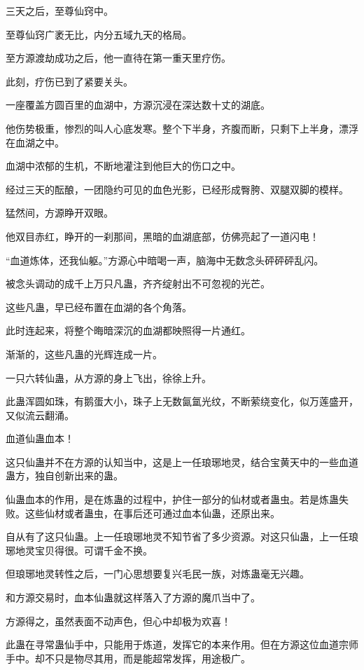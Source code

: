 
\begin{this_body}

三天之后，至尊仙窍中。

至尊仙窍广袤无比，内分五域九天的格局。

至方源渡劫成功之后，他一直待在第一重天里疗伤。

此刻，疗伤已到了紧要关头。

一座覆盖方圆百里的血湖中，方源沉浸在深达数十丈的湖底。

他伤势极重，惨烈的叫人心底发寒。整个下半身，齐腹而断，只剩下上半身，漂浮在血湖之中。

血湖中浓郁的生机，不断地灌注到他巨大的伤口之中。

经过三天的酝酿，一团隐约可见的血色光影，已经形成臀胯、双腿双脚的模样。

猛然间，方源睁开双眼。

他双目赤红，睁开的一刹那间，黑暗的血湖底部，仿佛亮起了一道闪电！

“血道炼体，还我仙躯。”方源心中暗喝一声，脑海中无数念头砰砰砰乱闪。

被念头调动的成千上万只凡蛊，齐齐绽射出不可忽视的光芒。

这些凡蛊，早已经布置在血湖的各个角落。

此时连起来，将整个晦暗深沉的血湖都映照得一片通红。

渐渐的，这些凡蛊的光辉连成一片。

一只六转仙蛊，从方源的身上飞出，徐徐上升。

此蛊浑圆如珠，有鹅蛋大小，珠子上无数氤氲光纹，不断萦绕变化，似万莲盛开，又似流云翻涌。

血道仙蛊血本！

这只仙蛊并不在方源的认知当中，这是上一任琅琊地灵，结合宝黄天中的一些血道蛊方，独自创新出来的蛊。

仙蛊血本的作用，是在炼蛊的过程中，护住一部分的仙材或者蛊虫。若是炼蛊失败。这些仙材或者蛊虫，在事后还可通过血本仙蛊，还原出来。

自从有了这只仙蛊。上一任琅琊地灵不知节省了多少资源。对这只仙蛊，上一任琅琊地灵宝贝得很。可谓千金不换。

但琅琊地灵转性之后，一门心思想要复兴毛民一族，对炼蛊毫无兴趣。

和方源交易时，血本仙蛊就这样落入了方源的魔爪当中了。

方源得之，虽然表面不动声色，但心中却极为欢喜！

此蛊在寻常蛊仙手中，只能用于炼道，发挥它的本来作用。但在方源这位血道宗师手中。却不只是物尽其用，而是能超常发挥，用途极广。


\end{this_body}
